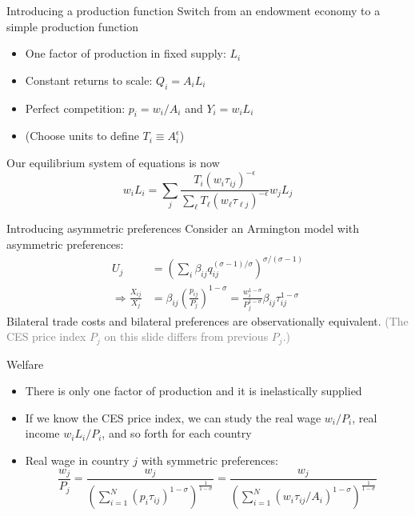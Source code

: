 \documentclass[10pt,notes=hide]{beamer}
\begin{document}
\begin{frame}{Introducing a production function}
Switch from an endowment economy to a simple production function
\begin{itemize}
\item 
One factor of production in fixed supply: $L_i$
\item
Constant returns to scale: $Q_i = A_i L_i$
\item
Perfect competition: $p_{i} = w_i / A_i$ and $Y_i = w_i L_i$
\item
(Choose units to define $T_i \equiv A_i^{\epsilon}$)
\end{itemize}
Our equilibrium system of equations is now
$$
w_i L_i
=
\sum_j \frac{T_i \left(w_i \tau_{ij}\right)^{-\epsilon}}{\sum_{\ell} T_{\ell} \left(w_{\ell} \tau_{\ell j}\right)^{-\epsilon}} w_j L_j
$$
\end{frame}
\begin{frame}{Introducing asymmetric preferences}
Consider an Armington model with asymmetric preferences:
\begin{align*}
	U_j &= \left(\sum_{i} \beta_{ij} q_{ij}^{(\sigma-1)/\sigma}\right)^{\sigma/(\sigma-1)}
	\\
	\Rightarrow
	\frac{X_{ij}}{X_j} &= \beta_{ij} \left(\frac{p_{ij}}{P_j}\right)^{1-\sigma} 
	=
	\frac{w_i^{1-\sigma}}{P_j^{1-\sigma}}\beta_{ij}\tau_{ij}^{1-\sigma}
\end{align*}
Bilateral trade costs and bilateral preferences are observationally equivalent.
\textcolor{gray}{(The CES price index $P_j$ on this slide differs from previous $P_j$.)}
\end{frame}
\begin{frame}{Welfare}
\begin{itemize}
\item There is only one factor of production and it is inelastically supplied
\item If we know the CES price index, we can study the real wage $w_i / P_i$, real income $w_i L_i / P_i$, and so forth for each country
\item Real wage in country $j$ with symmetric preferences:
$$
\frac{w_j}{P_{j}}
=
\frac{w_j}{\left(\sum_{i=1}^{N} \left(p_{i}\tau_{ij}\right)^{1-\sigma}\right)^{\frac{1}{1-\sigma}}}
=
\frac{w_j}{\left(\sum_{i=1}^{N} \left(w_i \tau_{ij} / A_i\right)^{1-\sigma}\right)^{\frac{1}{1-\sigma}}}
$$
\end{itemize}
\end{frame}
\end{document}
